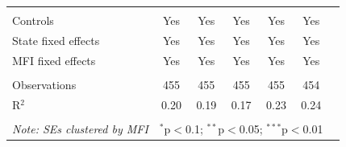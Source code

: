 \documentclass[12pt]{article}
\begin{document}
\begin{table}[!htbp]
\begin{tabular}{p{7cm}cccccc}
 \hline \\[-1.8ex] 
Controls & Yes & Yes & Yes & Yes & Yes \\ 
State fixed effects & Yes & Yes & Yes & Yes & Yes \\ 
MFI fixed effects & Yes & Yes & Yes & Yes & Yes \\ 
\hline \\[-1.8ex] 
Observations & 455 & 455 & 455 & 455 & 454 \\ 
R$^{2}$ & 0.20 & 0.19 & 0.17 & 0.23 & 0.24 \\ 
\hline 
\hline \\[-1.8ex] 
\textit{Note: SEs clustered by MFI}  & \multicolumn{5}{r}{$^{*}$p$<$0.1; $^{**}$p$<$0.05; $^{***}$p$<$0.01} \\ 
\end{tabular} 
\end{table} 
\end{document}
